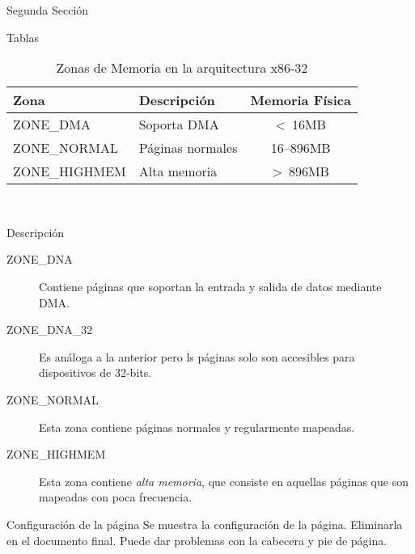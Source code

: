 \documentclass{article}
\begin{document}
\begin{section}{Segunda Sección}

\begin{subsection}{Tablas}

\lipsum[5]

\begin{table}[ht]
\caption{Zonas de Memoria en la arquitectura x86-32}
\centering \begin{tabular}{@{}llc@{}}
\hline
\textbf{Zona} & \textbf{Descripción}   & \textbf{Memoria Física}  \\ [0.5ex]
\hline
ZONE\_DMA     & Soporta DMA            & \textless \ 16MB           \\ [0.5ex]
ZONE\_NORMAL  & Páginas normales       & 16–896MB                 \\ [0.5ex]
ZONE\_HIGHMEM & Alta memoria           & \textgreater \ 896MB       \\ [1ex]
\hline
\end{tabular}
\label{table:memoria-x86-32}
\\
\end{table}

\end{subsection}

\begin{subsection}{Descripción}
\begin{description}
\item[ZONE\_DNA] Contiene páginas que soportan la entrada y salida de datos mediante DMA.
\item[ZONE\_DNA\_32] Es análoga a la anterior pero ls páginas solo son accesibles para
dispositivos de 32-bits.
\item[ZONE\_NORMAL] Esta zona contiene páginas normales y regularmente mapeadas.
\item[ZONE\_HIGHMEM] Esta zona contiene \textit{alta memoria}, que consiste en
 aquellas páginas que son mapeadas con poca frecuencia.
\end{description}

\end{subsection}

\pagebreak

\begin{subsection}{Configuración de la página}
Se muestra la configuración de la página. Eliminarla en el documento final. 
Puede dar problemas con la cabecera y pie de página.


\centering\layout
\end{subsection}

\end{section}
\end{document}
